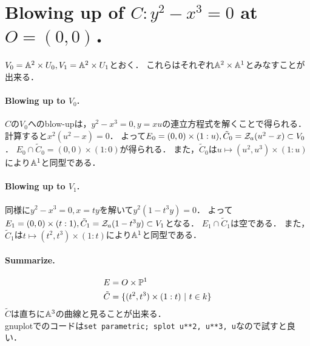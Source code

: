 \documentclass[a4paper]{jsarticle}
\begin{document}
\section{Blowing up of $C:y^2-x^3=0$ at $O=(0,0)$．} %
    $V_0=\mathbb{A}^2 \times U_0, V_1=\mathbb{A}^2 \times U_1$とおく．
    これらはそれぞれ$\mathbb{A}^2 \times \mathbb{A}^1$とみなすことが出来る．

    \paragraph{Blowing up to $V_0$.}
    $C$の$V_0$へのblow-upは，$y^2-x^3=0, y=xu$の連立方程式を解くことで得られる．
    計算すると$x^2(u^2-x)=0$．
    よって$E_0=(0,0) \times (1:u), \tilde{C}_0=\mathcal{Z}_a(u^2-x) \subset V_0$．
    $E_0 \cap \tilde{C}_0=(0,0) \times (1:0)$が得られる．
    また，$\tilde{C}_0$は$u \mapsto (u^2,u^3) \times (1:u)$により$\mathbb{A}^1$と同型である．

    \paragraph{Blowing up to $V_1$.}
    同様に$y^2-x^3=0, x=ty$を解いて$y^2 (1-t^3 y)=0$．
    よって$E_1=(0,0) \times (t:1), \tilde{C}_1=\mathcal{Z}_a(1-t^3 y) \subset V_1$となる．
    $E_1 \cap \tilde{C}_1$は空である．
    また，$\tilde{C}_1$は$t \mapsto (t^2,t^3) \times (1:t)$により$\mathbb{A}^1$と同型である．

    \paragraph{Summarize.}
    \begin{align*}
        E &= O \times \mathbb{P}^1 \\
        \tilde{C} &=\{ (t^2,t^3) \times (1:t) ~|~ t \in k \}
    \end{align*}
    $\tilde{C}$は直ちに$\mathbb{A}^3$の曲線と見ることが出来る． \\
    gnuplotでのコードは\texttt{set parametric; splot u**2, u**3, u}なので試すと良い．
\end{document}
